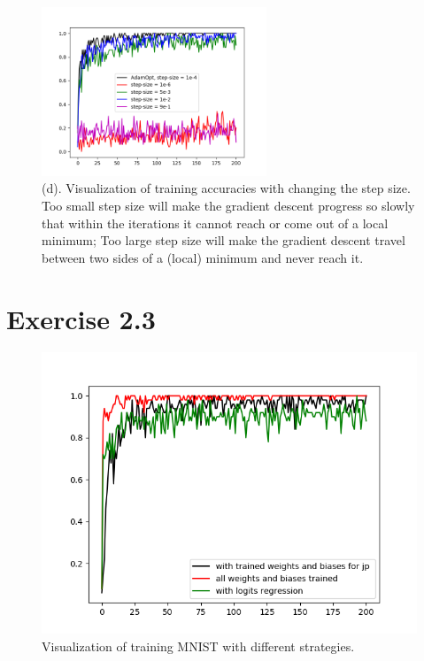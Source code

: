 \documentclass[11pt]{article} %
\begin{document}
\begin{figure}[htb]
  \centering
  \centerline{\includegraphics[width=0.6\textwidth ]{Figure_2_5.png}}
  \vspace{-5pt}
    \centering
\caption{(d). Visualization of training accuracies with changing the step size. Too small step size will make the gradient descent progress so slowly that within the iterations it cannot reach or come out of a local minimum; Too large step size will make the gradient descent travel between two sides of a (local) minimum and never reach it.}
\vspace{-1pt}
\end{figure}
\clearpage

\section*{Exercise 2.3}

\begin{figure}[htb]
  \centering
  \centerline{\includegraphics[width=1\textwidth ]{Figure_3.png}}
  \vspace{-5pt}
    \centering
\caption{Visualization of training MNIST with different strategies.}
\vspace{-1pt}
\end{figure}
\clearpage
\end{document}
